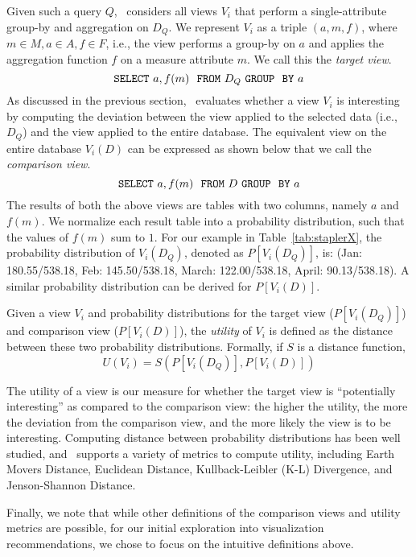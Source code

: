 Given such a query $Q$, \SeeDB\ considers all views $V_i$ that perform a
single-attribute group-by and aggregation on $D_Q$. We represent $V_i$ as a
triple $(a, m, f)$, where $m \in M, a \in A, f \in F$, i.e., the view
performs a group-by on $a$ and applies the aggregation function $f$ on a measure
attribute $m$. We call this the {\em target view}.
$${\tt SELECT \ } a, f(m) \ \ {\tt FROM} \  D_Q\  {\tt GROUP \ \ BY} \ a$$ 
As discussed in the previous section, \SeeDB\ evaluates
whether a view $V_i$ is interesting
by computing the deviation between the view applied to the selected data (i.e., $D_Q$) 
and the view applied to the entire database.
The equivalent view on the entire database $V_i (D)$ can be expressed as shown
below that we call the {\em comparison view}. 
$${\tt SELECT \ } a, f(m) \ \ {\tt FROM} \  D\  {\tt GROUP \ \ BY} \ a$$
The results of both the above views are tables with two columns, namely $a$ and
$f(m)$. We normalize each result table into a probability distribution, such
that the values of $f(m)$ sum to $1$.
For our example in Table~\ref{tab:staplerX}, the probability distribution of
$V_i(D_Q)$, denoted as $P[V_i (D_Q)]$, is: (Jan: 180.55/538.18, Feb:
145.50/538.18, March: 122.00/538.18,  April: 90.13/538.18). A similar
probability distribution can be derived for $P[V_i (D)]$.

Given a view $V_i$ and probability distributions for the
target view  ($P[V_i (D_Q)]$) and comparison view ($P[V_i (D)]$), the
{\em utility} of $V_i$ is defined as the distance between these two probability
distributions. Formally, if $S$ is a distance function,
$$ U (V_i) = S ( P[V_i (D_Q)], P[V_i (D)] )$$

The utility of a view is our measure for whether the target view is
``potentially interesting'' as compared to the comparison view:
the higher the utility, the more the deviation
from the comparison view, and the more likely the view is to be interesting.
Computing distance between probability distributions has
been well studied, and \SeeDB\ supports a variety of metrics
to compute utility, including Earth Movers Distance, 
Euclidean Distance, Kullback-Leibler (K-L) Divergence, and Jenson-Shannon
Distance. 

Finally, we note that while other definitions of the comparison views and
utility metrics are possible, for our initial exploration into 
visualization recommendations, we chose to focus on the intuitive definitions above.

